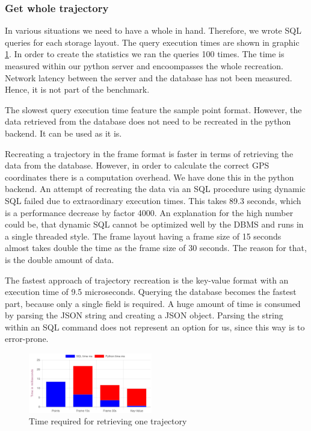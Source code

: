 \documentclass[10pt]{sig-alternate}
\begin{document}
\subsubsection{Get whole trajectory}
In various situations we need to have a whole in hand. Therefore, we wrote SQL queries for each storage layout. The query execution times are shown in graphic \ref{fig:bench_whole_trajectory}. In order to create the statistics we ran the queries 100 times. The time is measured within our python server and encoompasses the whole recreation. Network latency between the server and the database has not been measured. Hence, it is not part of the benchmark.

The slowest query execution time feature the sample point format. However, the data retrieved from the database does not need to be recreated in the python backend. It can be used as it is.

Recreating a trajectory in the frame format is faster in terms of retrieving the data from the database. However, in order to calculate the correct GPS coordinates there is a computation overhead. We have done this in the python backend. An attempt of recreating the data via an SQL procedure using dynamic SQL failed due to extraordinary execution times. This takes 89.3 seconds, which is a performance decrease by factor 4000. An explanation for the high number could be, that dynamic SQL cannot be optimized well by the DBMS and runs in a single threaded style. The frame layout having a frame size of 15 seconds almost takes double the time as the frame size of 30 seconds. The reason for that, is the double amount of data.

The fastest approach of trajectory recreation is the key-value format with an execution time of 9.5 microseconds. Querying the database becomes the fastest part, because only a single field is required. A huge amount of time is consumed by parsing the JSON string and creating a JSON object. Parsing the string within an SQL command does not represent an option for us, since this way is to error-prone.

\begin{figure}[ht]
\centering
\includegraphics[width=0.48\textwidth]{img/bench_whole_trajectory.png}
\caption{Time required for retrieving one trajectory}
\label{fig:bench_whole_trajectory}
\end{figure}
\end{document}
